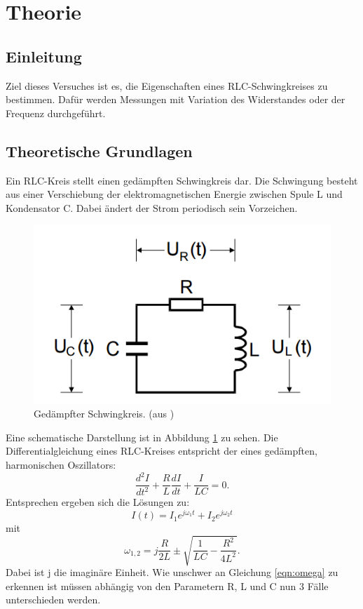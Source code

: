 \section{Theorie}
\label{sec:Theorie}

\subsection{Einleitung}
Ziel dieses Versuches ist es, die Eigenschaften eines RLC-Schwingkreises
zu bestimmen. Dafür werden Messungen mit Variation des Widerstandes oder der
Frequenz durchgeführt.

\subsection{Theoretische Grundlagen}
Ein RLC-Kreis stellt einen gedämpften Schwingkreis dar. Die Schwingung besteht
aus einer Verschiebung der elektromagnetischen Energie zwischen
Spule L und Kondensator C.
Dabei ändert der Strom periodisch sein
Vorzeichen.
\begin{figure}
  \centering
  \includegraphics{schwingkreis.png}
  \caption{Gedämpfter Schwingkreis. (aus \cite{protokoll})}
  \label{fig:RLC}
\end{figure}
Eine schematische Darstellung ist in Abbildung \ref{fig:RLC} zu sehen.
Die Differentialgleichung eines RLC-Kreises entspricht der eines
gedämpften, harmonischen
Oszillators:
\begin{equation}
   \frac{d^2I}{dt^2} + \frac{R}{L} \frac{dI}{dt} + \frac{I}{LC} = 0.
   \label{eqn:dgl}
\end{equation}
Entsprechen ergeben sich die Lösungen zu:
\begin{equation}
  I(t) = I_1 e^{j\omega_1t} + I_2 e^{j\omega_2t}
  \label{eqn:I}
\end{equation}
  mit
\begin{equation}
  \omega_{1,2} = j\frac{R}{2L} \pm \sqrt{\frac{1}{LC} - \frac{R^2}{4L^2}}.
  \label{eqn:omega}
\end{equation}
Dabei ist j die imaginäre Einheit.
Wie unschwer an Gleichung \ref{eqn:omega} zu erkennen ist müssen abhängig von
den Parametern R, L und C nun 3 Fälle unterschieden werden.


